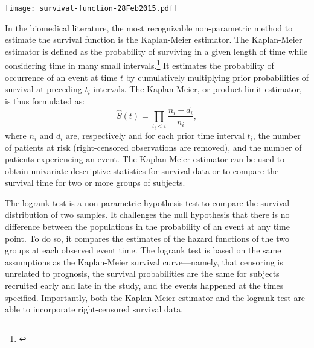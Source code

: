 \begin{marginfigure}%
  \texttt{[image: survival-function-28Feb2015.pdf]}
  \caption[Survival function]{The survival function, $S(t)$ describes the
    likelihood that a patient will have a lifetime exceeding time $t$.
    \textbf{A:}~The theoretical distribution is non-increasing, and
    characterized by $S(0)=1$ and $S(\infty)=0$.  \textbf{B:}~In practice, the
    estimated survival function, $\hat{S}(t)$, often takes the shape of a step
    function.  Because study periods are never infinite and there may be
    competing risks for failure, it is likely that not all patients will
    experience a clinical outcome by the end of the
    study.}\label{fig:survival-function}%
\end{marginfigure}

In the biomedical literature, the most recognizable non-parametric method to
estimate the survival function is the Kaplan-Meier
estimator.\cite{kaplan_nonparametric_1958} The Kaplan-Meier estimator is defined
as the probability of surviving in a given length of time while considering time
in many small intervals.\footnote{\citealp[pp. 365--93]{altman_practical_1990}}
It estimates the probability of occurrence of an event at time $t$ by
cumulatively multiplying prior probabilities of survival at preceding $t_i$
intervals.  The Kaplan-Meier, or product limit estimator, is thus formulated as:
\begin{equation}
  \label{eq:kaplan-meier}
\hat{S}(t)=\prod_{t_i<t}\frac{n_i-d_i}{n_i},
\end{equation}
where $n_i$ and $d_i$ are, respectively and for each prior time interval $t_i$,
the number of patients at risk (right-censored observations are removed), and
the number of patients experiencing an event.  The Kaplan-Meier estimator can be
used to obtain univariate descriptive statistics for survival data or to compare
the survival time for two or more groups of subjects.

The logrank test is a non-parametric hypothesis test to compare the survival
distribution of two
samples.\cite{mantel_evaluation_1966,peto_asymptotically_1972} It challenges the
null hypothesis that there is no difference between the populations in the
probability of an event at any time point.  To do so, it compares the estimates
of the hazard functions of the two groups at each observed event time.  The
logrank test is based on the same assumptions as the Kaplan-Meier survival
curve---namely, that censoring is unrelated to prognosis, the survival
probabilities are the same for subjects recruited early and late in the study,
and the events happened at the times specified.\cite{bland_logrank_2004}
Importantly, both the Kaplan-Meier estimator and the logrank test are able to
incorporate right-censored survival data.

